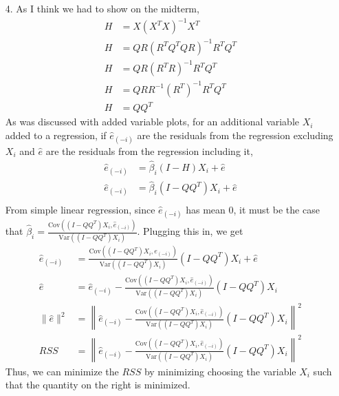 \documentclass[11pt]{article}
\newcommand{\var}{\mathrm{Var}}
\newcommand{\cov}{\mathrm{Cov}}
\theoremstyle{definition}
\begin{document}
\begin{itemize}
    \item[4.]
        As I think we had to show on the midterm,
        \begin{align*}
            H&= X(X^TX)^{-1}X^T \\
            H&= QR(R^TQ^TQR)^{-1}R^TQ^T \\
            H&= QR(R^TR)^{-1}R^TQ^T \\
            H&= QRR^{-1}(R^T)^{-1}R^TQ^T \\
            H&= QQ^T
        \end{align*}
        As was discussed with added variable plots, for an additional variable $X_i$ added to a regression, if $\hat e_{(-i)}$ are the residuals from the regression excluding $X_i$ and $\hat e$ are the residuals from the regression including it,
        \begin{align*}
            \hat e_{(-i)} &= \hat\beta_i (I-H) X_i + \hat e \\ 
            \hat e_{(-i)} &= \hat\beta_i (I-QQ^T) X_i + \hat e \\ 
        \end{align*}
        From simple linear regression, since \(\hat e_{(-i)}\) has mean $0$, it must be the case that \(\hat\beta_i=\frac{\cov((I-QQ^T) X_i,\hat e_{(-i)})}{\var((I-QQ^T) X_i)}\). Plugging this in, we get
        \begin{align*}
            \hat e_{(-i)} &= \frac{\cov((I-QQ^T) X_i,e_{(-i)})}{\var((I-QQ^T) X_i)} (I-QQ^T) X_i + \hat e \\ 
            \hat e &= \hat e_{(-i)} - \frac{\cov\left((I-QQ^T) X_i,\hat e_{(-i)}\right)}{\var\left((I-QQ^T) X_i\right)} (I-QQ^T) X_i \\ 
            \|\hat e\|^2 &= \left\|\hat e_{(-i)} - \frac{\cov\left((I-QQ^T) X_i,\hat e_{(-i)}\right)}{\var\left((I-QQ^T) X_i\right)} (I-QQ^T) X_i \right \|^2 \\
            RSS &= \left\|\hat e_{(-i)} - \frac{\cov\left((I-QQ^T) X_i,\hat e_{(-i)}\right)}{\var\left((I-QQ^T) X_i\right)} (I-QQ^T) X_i \right \|^2
        \end{align*}
        Thus, we can minimize the $RSS$ by minimizing choosing the variable $X_i$ such that the quantity on the right is minimized.
 

\end{itemize}
\end{document}
